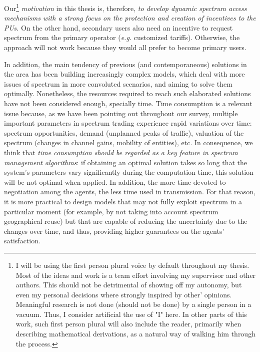 Our\footnote{I will be using the first person plural voice by default throughout my thesis. Most of the ideas and work is a team effort involving my supervisor and other authors. This should not be detrimental of showing off my autonomy, but even my personal decisions where strongly inspired by other' opinions. Meaningful research is not done (should not be done) by a single person in a vacuum. Thus, I consider artificial the use of "I" here. In other parts of this work, such first person plural will also include the reader, primarily when describing mathematical derivations, as a natural way of walking him through the process.} \emph{motivation} in this thesis is, therefore, \emph{to develop dynamic spectrum access mechanisms with a strong focus on the protection and creation of incentives to the PUs.} 
On the other hand, secondary users also need an incentive to request spectrum from the primary operator (\textit{e.g.} customized tariffs). Otherwise, the approach will not work because they would all prefer to become primary users.

In addition, the main tendency of previous (and contemporaneous) solutions in the area has been building increasingly complex models, which deal with more issues of spectrum in more convoluted scenarios, and aiming to solve them optimally. 
Nonetheless, the resources required to reach such elaborated solutions have not been considered enough, specially time. Time consumption is a relevant issue because, as we have been pointing out throughout our survey, multiple important parameters in spectrum trading experience rapid variations over time: spectrum opportunities, demand (unplanned peaks of traffic), valuation of the spectrum (changes in channel gains, mobility of entities), etc.
In consequence, we think that \emph{time consumption should be regarded as a key feature in spectrum management algorithms}: if obtaining an optimal solution takes so long that the system’s parameters vary significantly during the computation time, this solution will be not optimal when applied. In addition, the more time devoted to negotiation among the agents, the less time used in transmission. For that reason, it is more practical to design models that may not fully exploit spectrum in a particular moment (for example, by not taking into account spectrum geographical reuse) but that are capable of reducing the uncertainty due to the changes over time, and thus, providing higher guarantees on the agents’ satisfaction. 


